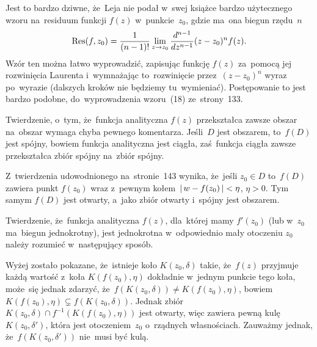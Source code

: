 \documentclass[a4paper,11pt]{article}
\begin{document}
\start {} Jest to bardzo dziwne, że~Leja nie podał w~swej
książce bardzo użytecznego wzoru na~residuum funkcji $f( z )$
w~punkcie~$z_{ 0 }$, gdzie ma~ona biegun rzędu~$n$
\begin{equation}
  \label{eq:Leja-48}
  \textrm{Res}( f, z_{ 0 } )
  = \frac{ 1 }{ ( n - 1 )! }
  \lim_{ z \to z_{ 0 } } \frac{ d^{  n - 1  } {   } }{ d {  z  }^{  n - 1  } } ( z - z_{ 0 } )^{ n } f( z ).
\end{equation}
Wzór ten można łatwo wyprowadzić, zapisując funkcję $f( z )$ za~pomocą
jej rozwinięcia Laurenta i~wymnażając to~rozwinięcie
przez~$( z - z_{ 0 } )^{ n }$ wyraz po~wyrazie (dalszych kroków nie
będziemy tu~wymieniać). Postępowanie to jest bardzo podobne,
do~wyprowadzenia wzoru~(18) ze~strony~133.

\vspace{\spaceFour}


\start {} Twierdzenie, o~tym, że~funkcja analityczna $f( z )$
przekształca zawsze obszar na~obszar wymaga chyba pewnego komentarza.
Jeśli~$D$ jest obszarem, to~$f( D )$ jest spójny, bowiem funkcja
analityczna jest ciągła, zaś~funkcja ciągła zawsze przekształca zbiór
spójny na~zbiór spójny.

Z~twierdzenia udowodnionego na~stronie~143 wynika, że~jeśli
$z_{ 0 } \in D$ to~$f( D )$ zawiera punkt $f( z_{ 0 } )$ wraz z~pewnym
kołem~$\left| \,  w - f( z_{ 0 } )  \, \right| < \eta$, $\eta > 0$. Tym samym
$f( D )$ jest otwarty, a~jako zbiór otwarty i~spójny jest obszarem.

\vspace{\spaceFour}


\start {} Twierdzenie, że~funkcja analityczna $f( z )$,
dla~której mamy $f'( z_{ 0 } )$ (lub w~$z_{ 0 }$ ma~biegun
jednokrotny), jest jednokrotna w~odpowiednio mały otoczeniu $z_{ 0 }$
należy rozumieć w~następujący sposób.

Wyżej zostało pokazane, że~istnieje koło $K( z_{ 0 }, \delta )$ takie,
że~$f( z )$ przyjmuje każdą wartość z~koła $K( f( z_{ 0 } ), \eta )$
dokładnie w~jednym punkcie tego koła, może~się jednak zdarzyć,
że~$f( K( z_{ 0 }, \delta ) ) \neq K( f( z_{ 0 } ), \eta )$, bowiem
$K( f( z_{ 0 } ), \eta ) \subsetneq f( K( z_{ 0 }, \delta ) )$. Jednak
zbiór $K( z_{ 0 }, \delta ) \cap f^{ -1 }( K( f( z_{ 0 } ), \eta ) )$
jest otwarty, więc zawiera pewną kulę $K( z_{ 0 }, \delta' )$, która
jest otoczeniem~$z_{ 0 }$ o~rządnych własnościach. Zauważmy jednak,
że~$f( K( z_{ 0 }, \delta' ) )$ nie~musi być kulą.

\vspace{\spaceFour}
\end{document}
